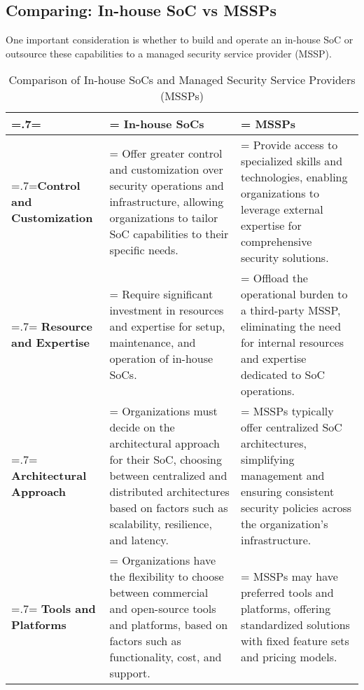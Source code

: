 \subsection{Comparing: In-house SoC vs MSSPs}
One important consideration is whether to build and operate an in-house SoC or outsource these capabilities to a managed security service provider (MSSP).
\begin{table}[H]
    \renewcommand{\arraystretch}{1.5}%
    \caption{Comparison of In-house SoCs and Managed Security Service Providers (MSSPs)}
    \centering
    \medskip
    \begin{tabularx}{1\textwidth} {
            | >{\hsize=.7\hsize\linewidth=\hsize\centering\arraybackslash}X
            | >{\hsize=1.15\hsize\linewidth=\hsize\justifying\arraybackslash}X
            | >{\hsize=1.15\hsize\linewidth=\hsize\justifying\arraybackslash}X |}
        \hline
        \rowcolor{primary}                 & \textbf{In-house SoCs}                                                                                                                                                                           & \textbf{MSSPs}                                                                                                                                                  \\
        \hline
        \textbf{Control and Customization} & Offer greater control and customization over security operations and infrastructure, allowing organizations to tailor SoC capabilities to their specific needs.                                  & Provide access to specialized skills and technologies, enabling organizations to leverage external expertise for comprehensive security solutions.              \\
        \hline
        \textbf{Resource and Expertise}    & Require significant investment in resources and expertise for setup, maintenance, and operation of in-house SoCs.                                                                                & Offload the operational burden to a third-party MSSP, eliminating the need for internal resources and expertise dedicated to SoC operations.                    \\
        \hline
        \textbf{Architectural Approach}    & Organizations must decide on the architectural approach for their SoC, choosing between centralized and distributed architectures based on factors such as scalability, resilience, and latency. & MSSPs typically offer centralized SoC architectures, simplifying management and ensuring consistent security policies across the organization's infrastructure. \\
        \hline
        \textbf{Tools and Platforms}       & Organizations have the flexibility to choose between commercial and open-source tools and platforms, based on factors such as functionality, cost, and support.                                  & MSSPs may have preferred tools and platforms, offering standardized solutions with fixed feature sets and pricing models.                                       \\
        \hline
    \end{tabularx}
\end{table}

